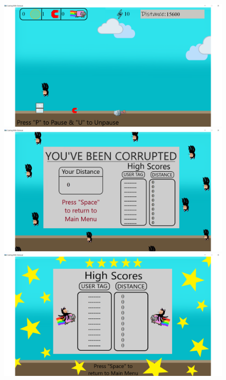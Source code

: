 \documentclass[10pt,conference,onecolumn,compsoc]{IEEEtran}
\begin{document}
\begin{figure}[!ht]
\centering
\includegraphics[scale=.2]{In-Game3.png}
\caption{}

\includegraphics[scale=.2]{EndGame.png}
\caption{}

\includegraphics[scale=.2]{HighscoresMockup.png}
\caption{}
\end{figure}
\end{document}
